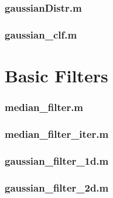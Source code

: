 \subsubsection*{\hypertarget{gaussianDistr}{gaussianDistr.m}}


\subsubsection*{\hypertarget{gaussianclf}{gaussian\_clf.m}}



\newpage
\section{Basic Filters}
\subsubsection*{\hypertarget{medianfilter}{median\_filter.m}}


\subsubsection*{\hypertarget{medianfiliter}{median\_filter\_iter.m}}


\subsubsection*{\hypertarget{gaussfilter}{gaussian\_filter\_1d.m}}


\subsubsection*{\hypertarget{gauss2d}{gaussian\_filter\_2d.m}}



